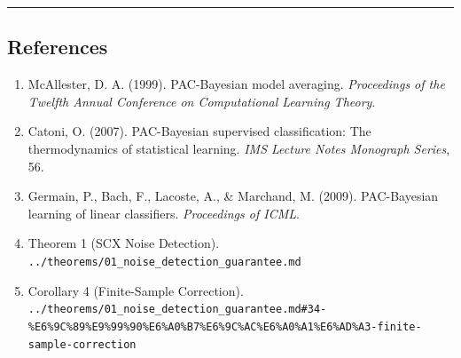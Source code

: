 \documentclass[
  12pt,
]{ctexart}
\begin{document}
\begin{center}\rule{0.5\linewidth}{0.5pt}\end{center}

\subsection{References}\label{references}

\begin{enumerate}
\def\labelenumi{\arabic{enumi}.}
\item
  McAllester, D. A. (1999). PAC-Bayesian model averaging.
  \emph{Proceedings of the Twelfth Annual Conference on Computational
  Learning Theory}.
\item
  Catoni, O. (2007). PAC-Bayesian supervised classification: The
  thermodynamics of statistical learning. \emph{IMS Lecture Notes
  Monograph Series}, 56.
\item
  Germain, P., Bach, F., Lacoste, A., \& Marchand, M. (2009).
  PAC-Bayesian learning of linear classifiers. \emph{Proceedings of
  ICML}.
\item
  Theorem 1 (SCX Noise Detection).
  \texttt{../theorems/01\_noise\_detection\_guarantee.md}
\item
  Corollary 4 (Finite-Sample Correction).
  \texttt{../theorems/01\_noise\_detection\_guarantee.md\#34-\%E6\%9C\%89\%E9\%99\%90\%E6\%A0\%B7\%E6\%9C\%AC\%E6\%A0\%A1\%E6\%AD\%A3-finite-sample-correction}
\end{enumerate}
\end{document}
